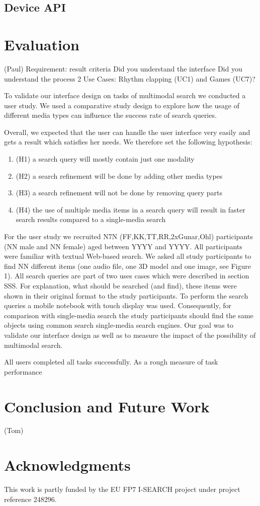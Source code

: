 \documentclass[runningheads,a4paper]{llncs} \usepackage[utf8]{inputenc}
\begin{document}
\subsection{Device API}

\section{Evaluation}
(Paul)
Requirement: result criteria
Did you understand the interface
Did you understand the process
2 Use Cases: Rhythm clapping (UC1) and Games (UC7)?

To validate our interface design on tasks of multimodal search we conducted a user study. 
We used a comparative study design to explore how the usage of different media types can 
influence the success rate of search queries. 

Overall, we expected that the user can handle the user interface very easily and gets a 
result which satisfies her needs. We therefore set the following hypothesis: 
\begin{enumerate}
  \item (H1) a search query will mostly contain just one modality
  \item (H2) a search refinement will be done by adding other media types
  \item (H3) a search refinement will not be done by removing query parts
  \item (H4) the use of multiple media items in a search query will result
  in faster search results compared to a single-media search
\end{enumerate}

For the user study we recruited N7N (FF,KK,TT,RR,2xGunar,Ohl) participants (NN male and NN female) aged between YYYY and YYYY. All participants were familiar with textual Web-based search. We asked all study participants to find NN different items (one audio file, one 3D model and one image, see Figure 1). All search queries are part of two uses cases which were described in section SSS. For explanation, what should be searched (and find), these items were shown in their original format to the study participants. To perform the search queries a mobile notebook with touch display was used. Consequently, for comparison with single-media search the study participants should find the same objects using common search single-media search engines. Our goal was to validate our interface design as well as to measure the impact of the possibility of multimodal search. 

All users completed all tasks successfully. As a rough measure of task performance

\section{Conclusion and Future Work}
(Tom)

\section{Acknowledgments}
This work is partly funded by the EU FP7 \mbox{I-SEARCH} project under project reference 248296.



\end{document}
